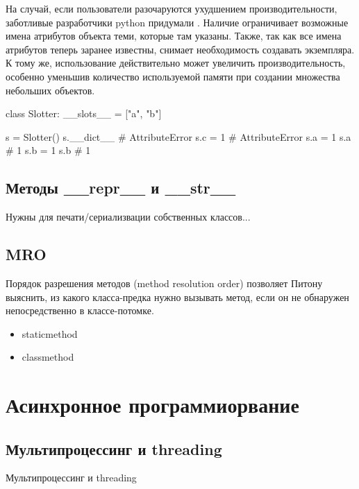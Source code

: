 	На случай, если пользователи разочаруются ухудшением производительности, заботливые разработчики python придумали .
	Наличие  ограничивает возможные имена атрибутов объекта теми, которые там указаны. Также, так как все имена атрибутов теперь заранее известны, снимает необходимость создавать  экземпляра.
	К тому же, использование  действительно может увеличить производительность, особенно уменьшив количество используемой памяти при создании множества небольших объектов.
	
	\begin{python}
class Slotter:
    __slots__ = ["a", "b"]

s = Slotter()
s.__dict__      # AttributeError
s.c = 1         # AttributeError
s.a = 1
s.a             # 1
s.b = 1
s.b             # 1
	\end{python}

\subsection{Методы \_\_repr\_\_ и \_\_str\_\_}

Нужны для печати/сериализвации собственных классов...
	
\subsection{MRO}

Порядок разрешения методов (method resolution order) позволяет Питону выяснить, из какого класса-предка нужно вызывать метод, если он не обнаружен непосредственно в классе-потомке. 

\begin{itemize}
\item staticmethod
\item classmethod
\end{itemize}

\section{Асинхронное программиорвание}

\subsection{Мультипроцессинг и threading}

Мультипроцессинг и threading

